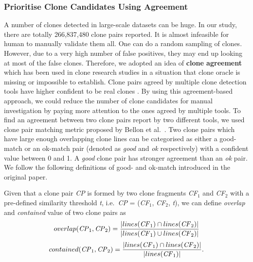 \documentclass[sigconf,review, anonymous]{acmart}
\newcommand{\squeezeup}{\vspace{-0.5mm}}
\begin{document}
\subsubsection{Prioritise Clone Candidates Using Agreement}
A number of clones detected in large-scale datasets can be huge. In our study, there are totally 266,837,480 clone pairs reported. It is almost infeasible for human to manually validate them all. One can do a random sampling of clones. However, due to a very high number of false positives, they may end up looking at most of the false clones. Therefore, we adopted an idea of \textbf{clone agreement} which has been used in clone research studies \cite{Wang2013,Funaro2010,cr2016ssbse} in a situation that clone oracle is missing or impossible to establish. Clone pairs agreed by multiple clone detection tools have higher confident to be real clones \cite{cr2016ssbse}. By using this agreement-based approach, we could reduce the number of clone candidates for manual investigation by paying more attention to the ones agreed by multiple tools. To find an agreement between two clone pairs report by two different tools, we used clone pair matching metric proposed by Bellon et al.~\cite{Bellon2007}. Two clone pairs which have large enough overlapping clone lines can be categorised as either a good-match or an ok-match pair (denoted as \textit{good} and \textit{ok} respectively) with a confident value between 0 and 1. A \textit{good} clone pair has stronger agreement than an \textit{ok} pair. We follow the following definitions of good- and ok-match introduced in the original paper.

\vspace{0.5ex}
Given that a clone pair \textit{CP} is formed by two clone fragments \textit{CF$_1$} and \textit{CF$_2$} with a pre-defined similarity threshold \textit{t}, i.e.~\textit{CP} = (\textit{CF$_1$}, \textit{CF$_2$}, \textit{t}), we can define \textit{overlap} and \textit{contained} value of two clone pairs as 
\begin{multline}
	overlap(\textrm{\textit{CP}}_1, \textrm{\textit{CP}}_2) = \frac{|lines(\textrm{\textit{CF}}_1) \cap lines(\textrm{\textit{CF}}_2)|}{|lines(\textrm{\textit{CF}}_1) \cup lines(\textrm{\textit{CF}}_2)|} 
\end{multline}
\begin{multline}
	contained(\textrm{\textit{CP}}_1, \textrm{\textit{CP}}_2) = \frac{|lines(\textrm{\textit{CF}}_1) \cap lines(\textrm{\textit{CF}}_2)|}{|lines(\textrm{\textit{CF}}_1)|}. 
\end{multline}
\end{document}
